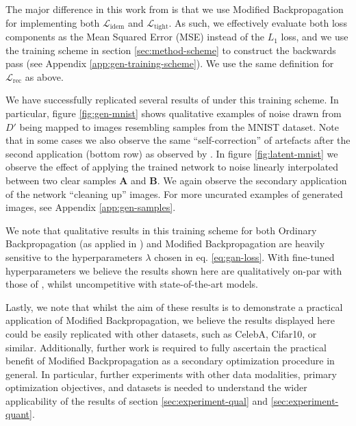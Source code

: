 \documentclass{article}
\theoremstyle{plain}
\theoremstyle{definition}
\theoremstyle{remark}
\newcommand{\vA}{\mathbf{A}}
\newcommand{\vB}{\mathbf{B}}
\begin{document}
The major difference in this work from \citealt{shocher-ign} is that we use Modified Backpropagation for implementing both $\mathcal{L}_{\mathrm{idem}}$ and $\mathcal{L}_{\mathrm{tight}}$. As such, we effectively evaluate both loss components as the Mean Squared Error (MSE) instead of the $L_1$ loss, and we use the training scheme in section \ref{sec:method-scheme} to construct the backwards pass (see Appendix \ref{app:gen-training-scheme}). We use the same definition for $\mathcal{L}_{\mathrm{rec}}$ as above.

We have successfully replicated several results of \cite{shocher-ign} under this training scheme. In particular, figure \ref{fig:gen-mnist} shows qualitative examples of noise drawn from $D'$ being mapped to images resembling samples from the MNIST dataset. Note that in some cases we also observe the same ``self-correction'' of artefacts after the second application (bottom row) as observed by \cite{shocher-ign}. In figure \ref{fig:latent-mnist} we observe the effect of applying the trained network to noise linearly interpolated between two clear samples $\vA$ and $\vB$. We again observe the secondary application of the network ``cleaning up'' images. For more uncurated examples of generated images, see Appendix \ref{app:gen-samples}.

We note that qualitative results in this training scheme for both Ordinary Backpropagation (as applied in \citealt{shocher-ign}) and Modified Backpropagation are heavily sensitive to the hyperparameters $\lambda$ chosen in eq. \ref{eq:gan-loss}. With fine-tuned hyperparameters we believe the results shown here are qualitatively on-par with those of \citealt{shocher-ign}, whilst uncompetitive with state-of-the-art models.


Lastly, we note that whilst the aim of these results is to demonstrate a practical application of Modified Backpropagation, we believe the results displayed here could be easily replicated with other datasets, such as CelebA, Cifar10, or similar. Additionally, further work is required to fully ascertain the practical benefit of Modified Backpropagation as a secondary optimization procedure in general. In particular, further experiments with other data modalities, primary optimization objectives, and datasets is needed to understand the wider applicability of the results of section \ref{sec:experiment-qual} and \ref{sec:experiment-quant}.
\end{document}
